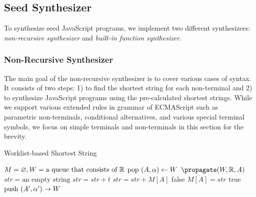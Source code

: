 \subsection{Seed Synthesizer}

To synthesize seed JavaScript programs, we implement two different
synthesizers: \textit{non-recursive synthesizer} and \textit{built-in function
synthesizer}.
\newline

\subsubsection{Non-Recursive Synthesizer}

The main goal of the non-recursive synthesizer is to cover various cases of
syntax.  It consists of two steps: 1) to find the shortest string for each
non-terminal and 2) to synthesize JavaScript programs using the pre-calculated
shortest strings.  While we support various extended rules in grammar of
ECMAScript such as parametric non-terminals, conditional alternatives, and
various special terminal symbols, we focus on simple terminals and non-terminals
in this section for the brevity.

\begin{algorithm}[t]
  \caption{Worklist-based Shortest String}
  \label{alg:short-string}
  \DontPrintSemicolon
   {
    $M = \varnothing, W = \text{a queue that consists of}\ \mathbb{R}$\;
    \While{$\worklist \neq \varnothing$} {
      $\text{pop}\ (A, \alpha) \gets W$\;
       {
        $\propagate(\worklist, \ruleset, A)$
      }
    }
  }
   {
    $str = \text{an empty string}$\;
     {
       {
        $str = str + t$
      }
       {
        $str = str + M[A]$
      }
    }
     {
      \Return false
    }
    $M[A] = str$\;
    \Return true\;
  }
   {
     {
       {
        $\text{push}\ (A', \alpha') \rightarrow W$
      }
    }
  }
\end{algorithm}

